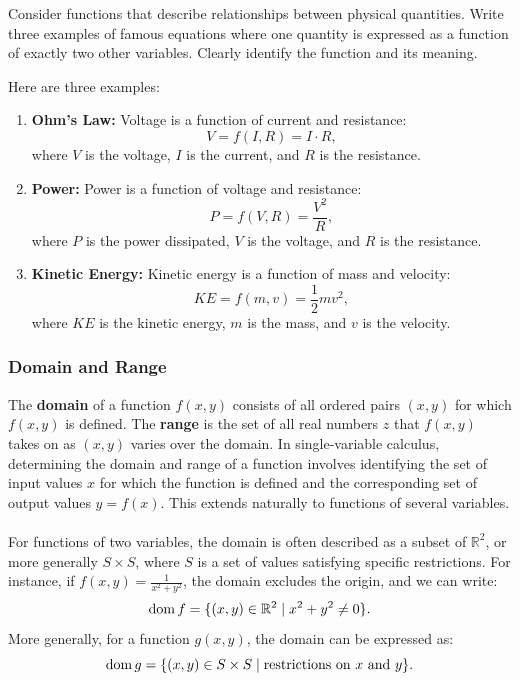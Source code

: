 \exampleline
\begin{example}
Consider functions that describe relationships between physical quantities. Write three examples of famous equations where one quantity is expressed as a function of exactly two other variables. Clearly identify the function and its meaning.


\begin{solution}
Here are three examples:

\begin{enumerate}
    \item \textbf{Ohm's Law:} Voltage is a function of current and resistance:
    \[
    V = f(I, R) = I \cdot R,
    \]
    where \( V \) is the voltage, \( I \) is the current, and \( R \) is the resistance.

    \item \textbf{Power:} Power is a function of voltage and resistance:
    \[
    P = f(V, R) = \frac{V^2}{R},
    \]
    where \( P \) is the power dissipated, \( V \) is the voltage, and \( R \) is the resistance.

    \item \textbf{Kinetic Energy:} Kinetic energy is a function of mass and velocity:
    \[
    KE = f(m, v) = \frac{1}{2} m v^2,
    \]
    where \( KE \) is the kinetic energy, \( m \) is the mass, and \( v \) is the velocity.
\end{enumerate}
\end{solution}
\end{example}
\exampleline

\subsubsection*{Domain and Range}

\noindent The \textbf{domain} of a function \( f(x, y) \) consists of all ordered pairs \( (x, y) \) for which \( f(x, y) \) is defined. The \textbf{range} is the set of all real numbers \( z \) that \( f(x, y) \) takes on as \( (x, y) \) varies over the domain. In single-variable calculus, determining the domain and range of a function involves identifying the set of input values \( x \) for which the function is defined and the corresponding set of output values \( y = f(x) \). This extends naturally to functions of several variables. \\ \\ For functions of two variables, the domain is often described as a subset of \( \mathbb{R}^2 \), or more generally \( S \times S \), where \( S \) is a set of values satisfying specific restrictions. For instance, if \( f(x, y) = \frac{1}{x^2 + y^2} \), the domain excludes the origin, and we can write:
\[
\mathrm{dom}\,f = \{(x, y) \in \mathbb{R}^2 \mid x^2 + y^2 \neq 0\}.
\]
More generally, for a function \( g(x, y) \), the domain can be expressed as:
\[
\mathrm{dom}\,g = \{(x, y) \in S \times S \mid \text{restrictions on } x \text{ and } y\}.
\]


